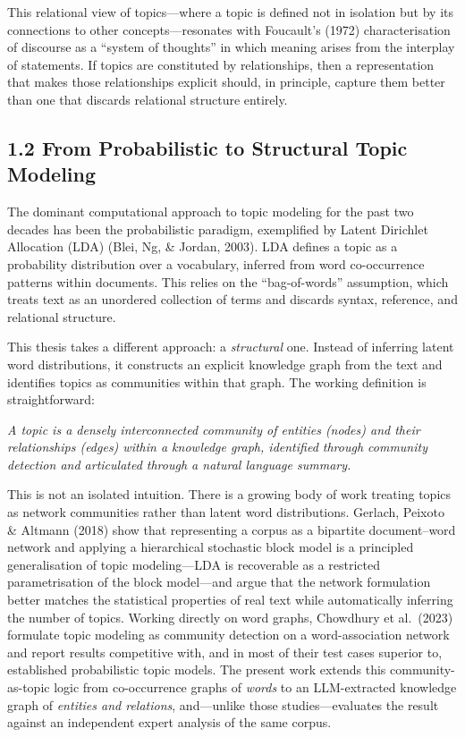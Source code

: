 \documentclass[11pt]{article}
\begin{document}
This relational view of topics---where a topic is defined not in isolation but by its connections to other concepts---resonates with Foucault's (1972) characterisation of discourse as a ``system of thoughts'' in which meaning arises from the interplay of statements. If topics are constituted by relationships, then a representation that makes those relationships explicit should, in principle, capture them better than one that discards relational structure entirely.

\subsection{1.2 From Probabilistic to Structural Topic Modeling}

The dominant computational approach to topic modeling for the past two decades has been the probabilistic paradigm, exemplified by Latent Dirichlet Allocation (LDA) (Blei, Ng, \& Jordan, 2003). LDA defines a topic as a probability distribution over a vocabulary, inferred from word co-occurrence patterns within documents. This relies on the ``bag-of-words'' assumption, which treats text as an unordered collection of terms and discards syntax, reference, and relational structure.

This thesis takes a different approach: a \emph{structural} one. Instead of inferring latent word distributions, it constructs an explicit knowledge graph from the text and identifies topics as communities within that graph. The working definition is straightforward:

\emph{A topic is a densely interconnected community of entities (nodes) and their relationships (edges) within a knowledge graph, identified through community detection and articulated through a natural language summary.}

This is not an isolated intuition. There is a growing body of work treating topics as network communities rather than latent word distributions. Gerlach, Peixoto \& Altmann (2018) show that representing a corpus as a bipartite document--word network and applying a hierarchical stochastic block model is a principled generalisation of topic modeling---LDA is recoverable as a restricted parametrisation of the block model---and argue that the network formulation better matches the statistical properties of real text while automatically inferring the number of topics. Working directly on word graphs, Chowdhury et al.\ (2023) formulate topic modeling as community detection on a word-association network and report results competitive with, and in most of their test cases superior to, established probabilistic topic models. The present work extends this community-as-topic logic from co-occurrence graphs of \emph{words} to an LLM-extracted knowledge graph of \emph{entities and relations}, and---unlike those studies---evaluates the result against an independent expert analysis of the same corpus.
\end{document}
